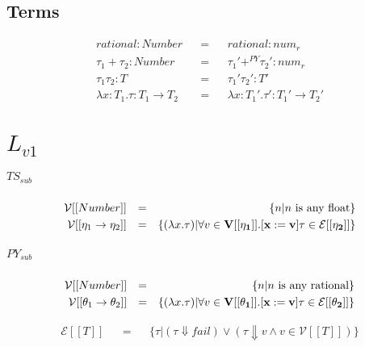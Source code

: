 \documentclass{article}
\begin{document}
	\subsection{Terms}
	\begin{align*}
	rational: Number						 && = && rational: num_r\\
	\tau_1 + \tau_2: Number					 && = && \tau_1' +^{PY} \tau_2': num_r\\
	\tau_1 \tau_2: T						 && = && \tau_1' \tau_2': T'\\
	\lambda x: T_1.\tau: T_1 \rightarrow T_2 && = && \lambda x: T_1'.\tau': T_1' \rightarrow T_2'
	\end{align*}


	\section{$L_{v1}$}
	
	\subparagraph{$TS_{sub}$}
	\begin{align*}
		\mathcal{V}[[Number]]				&& = && \{ n| n \text{ is any float}\}\\
		\mathcal{V}[[\eta_1 \rightarrow \eta_2]]	&& = && \{ 
				(\lambda x.\tau)| 
				\forall v \in \bf{V}[[\eta_1]].[x:=v]\tau \in \mathcal{E}[[\eta_2]]
		\}
	\end{align*}
	
	\subparagraph{$PY_{sub}$}
	\begin{align*}
		\mathcal{V}[[Number]]				&& = && \{ n| n \text{ is any rational}\}\\
		\mathcal{V}[[\theta_1 \rightarrow \theta_2]]	&& = && \{ 
		(\lambda x.\tau)| 
		\forall v \in \bf{V}[[\theta_1]].[x:=v]\tau \in \mathcal{E}[[\theta_2]]
		\}
	\end{align*}
	
	\begin{align*}
		\mathcal{E}[[T]] && = && \{
		\tau | (\tau \Downarrow fail) \lor
		(\tau \Downarrow v \land v \in \mathcal{V}[[T]])
	\}
	\end{align*}
	
	\printbibliography[heading=bibintoc]
\end{document}
